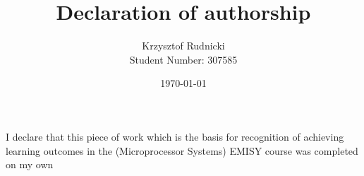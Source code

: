 \documentclass{article}
\date{\today}
\title{Declaration of authorship}
\author{Krzysztof Rudnicki \\ Student Number: 307585}
\begin{document}
\maketitle
\thispagestyle{empty}
\Large
I declare that this piece of work which is the basis for recognition of achieving learning outcomes in the (Microprocessor Systems) EMISY course was completed on my own
\end{document}
